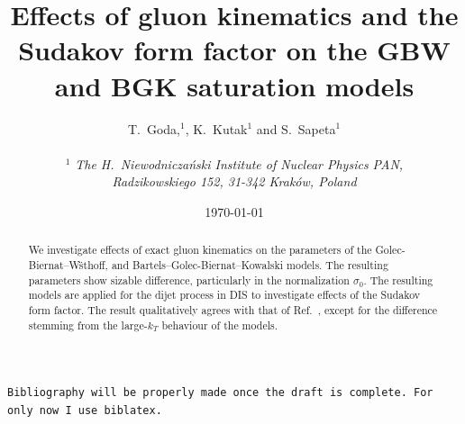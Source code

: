 \documentclass[12pt]{article}
\author{
T.~Goda,$^1$, K.~Kutak$^{1}$ and S.~Sapeta$^1$\\\,\\
$^1$ 
{\small\it The H.\ Niewodnicza\'nski Institute of Nuclear Physics PAN,}\\ 
{\small\it Radzikowskiego 152, 31-342 Krak\'ow, Poland}\\%
}
\title{Effects of gluon kinematics and the Sudakov form factor on the GBW and BGK saturation models}
\date{\today}
\numberwithin{equation}{section}
\numberwithin{table}{section}
\numberwithin{figure}{section}
\newcommand{\comment}[1]{\texttt{\color{red}#1}}
\begin{document}
\maketitle

\vspace{-25em}
\begin{flushright}
\end{flushright}
\vspace{20em}

\begin{abstract}
  We investigate effects of exact gluon kinematics on the parameters of the Golec-Biernat--W\"sthoff, and Bartels--Golec-Biernat--Kowalski models. The resulting parameters show sizable difference, particularly in the normalization $\sigma_0$. The resulting models are applied for the dijet process in DIS to investigate effects of the Sudakov form factor. 
  The result qualitatively agrees with that of Ref.~\cite{vanHameren:2021sqc}, except for the difference stemming from the large-$k_T$ behaviour of the models.
\end{abstract}
%
%
\comment{Bibliography will be properly made once the draft is complete. For only now I use biblatex.}
\end{document}
